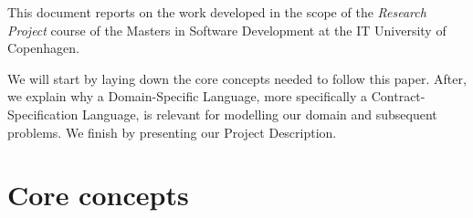 \documentclass{ituthesis}
\begin{document}





This document reports on the work developed in the scope of the \textit{Research Project} course of the Masters in Software Development at the IT University of Copenhagen.\par

We will start by laying down the core concepts needed to follow this paper. After, we explain why a Domain-Specific Language, more specifically a Contract-Specification Language, is relevant for modelling our domain and subsequent problems. We finish by presenting our Project Description.

\section{Core concepts}
\end{document}

